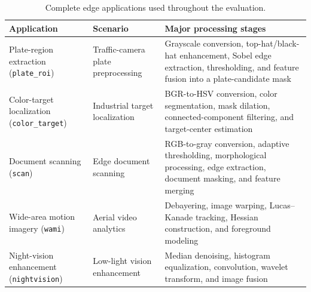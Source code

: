 
\begin{table}[!t]
\centering
\caption{Complete edge applications used throughout the evaluation.}
\label{tab:e2e_applications}
\footnotesize
\renewcommand{\arraystretch}{1.12}

\begin{tabularx}{\textwidth}{p{3.1cm}p{4.0cm}X}
\toprule
\textbf{Application} & \textbf{Scenario} & \textbf{Major processing stages} \\
\midrule

Plate-region extraction (\texttt{plate\_roi}) &
Traffic-camera plate preprocessing &
Grayscale conversion, top-hat/black-hat enhancement, Sobel edge extraction, thresholding, and feature fusion into a plate-candidate mask \\

Color-target localization (\texttt{color\_target}) &
Industrial target localization &
BGR-to-HSV conversion, color segmentation, mask dilation, connected-component filtering, and target-center estimation \\

Document scanning (\texttt{scan}) &
Edge document scanning &
RGB-to-gray conversion, adaptive thresholding, morphological processing, edge extraction, document masking, and feature merging \\

Wide-area motion imagery (\texttt{wami}) &
Aerial video analytics &
Debayering, image warping, Lucas--Kanade tracking, Hessian construction, and foreground modeling \\

Night-vision enhancement (\texttt{nightvision}) &
Low-light vision enhancement &
Median denoising, histogram equalization, convolution, wavelet transform, and image fusion \\

\bottomrule
\end{tabularx}
\end{table}
